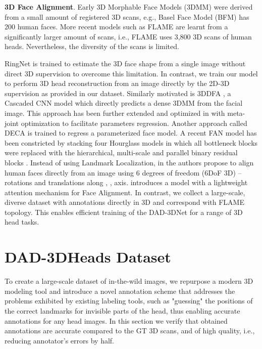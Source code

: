 \documentclass[10pt,twocolumn,letterpaper]{article}
\begin{document}
\textbf{3D Face Alignment}. Early 3D Morphable Face Models (3DMM) \cite{3dmm, bazelface} were derived from a small amount of registered 3D scans, e.g.,  Basel Face Model (BFM) \cite{bazelface} has 200 human faces. 
More recent models such as FLAME \cite{FLAME} are learnt from a significantly larger amount of scans, i.e., FLAME uses 3,800 3D scans of human heads. 
Nevertheless, the diversity of the scans is limited. 

RingNet\cite{RingNet} is trained to estimate the 3D face shape from a single image without direct 3D supervision to overcome this limitation. 
In contrast, we train our model to perform 3D head reconstruction from an image directly by the 2D-3D supervision as provided in our dataset.
Similarly motivated is 3DDFA \cite{zhu2017face}, a Cascaded CNN model which directly predicts a dense 3DMM from the facial image. 
This approach has been further extended and optimized in \cite{guo2020towards} with meta-joint optimization to facilitate parameters regression. 
Another approach called DECA \cite{DECA} is trained to regress a parameterized face model. 
A recent FAN model \cite{bulat_how_far} has been constricted by stacking four Hourglass models \cite{newell, StackedHourglass} in which all bottleneck blocks were replaced with the hierarchical, multi-scale and parallel binary residual blocks \cite{bulat_binarized}.
Instead of using Landmark Localization, in \cite{FacePoseNet} the authors propose to align human faces directly from an image using 6 degrees of freedom (6DoF 3D) -- rotations and translations along , ,  axis. 
\cite{DAMDNet} introduces a model with a lightweight attention mechanism for Face Alignment. 
In contrast, we collect a large-scale, diverse dataset with annotations directly in 3D and correspond with FLAME topology. This enables efficient training of the DAD-3DNet for a range of 3D head tasks. 
%
 \section{DAD-3DHeads Dataset}







To create a large-scale dataset of in-the-wild images, we repurpose a modern 3D
modeling tool and introduce a novel annotation scheme that addresses the problems exhibited by existing labeling tools, such as "guessing" the positions of the correct landmarks for invisible parts of the head, thus enabling accurate annotations for any head images.
In this section we verify that obtained annotations are accurate compared to the GT 3D scans, and of high quality, i.e., reducing annotator's errors by half. 
\end{document}

